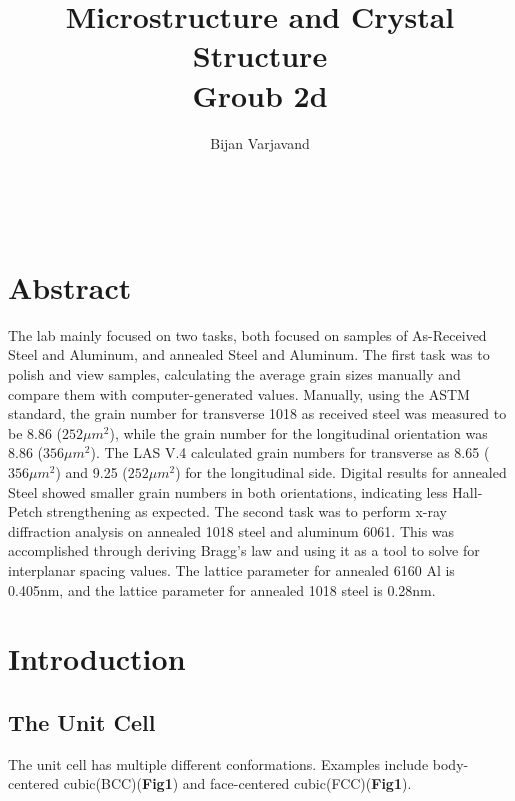 \documentclass{article}
\author{Bijan Varjavand}
\title{Microstructure and Crystal Structure\\Groub 2d}
\begin{document}
\maketitle
\ \\[2.5in]

\section{Abstract}
The lab mainly focused on two tasks, both focused on samples of As-Received Steel and Aluminum, and annealed Steel and Aluminum. The first task was to polish and view samples, calculating the average grain sizes manually and compare them with computer-generated values. Manually, using the ASTM standard, the grain number for transverse 1018 as received steel was measured to be 8.86 ($252 \mu m^2$), while the grain number for the longitudinal orientation was 8.86 ($356 \mu m^2$). The LAS V.4 calculated grain numbers for transverse as 8.65 ($356 \mu m^2$) and 9.25 ($252 \mu m^2$) for the longitudinal side. Digital results for annealed Steel showed smaller grain numbers in both orientations, indicating less Hall-Petch strengthening as expected. The second task was to perform x-ray diffraction analysis on annealed 1018 steel and aluminum 6061. This was accomplished through deriving Bragg's law and using it as a tool to solve for interplanar spacing values. The lattice parameter for annealed 6160 Al is 0.405nm, and the lattice parameter for annealed 1018 steel is 0.28nm.

\clearpage

\section{Introduction}

\subsection{The Unit Cell}

The unit cell has multiple different conformations. Examples include body-centered cubic(BCC)(\textbf{Fig1}) and face-centered cubic(FCC)(\textbf{Fig1}).
\end{document}
